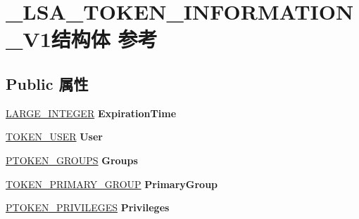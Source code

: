 \hypertarget{struct___l_s_a___t_o_k_e_n___i_n_f_o_r_m_a_t_i_o_n___v1}{}\section{\+\_\+\+L\+S\+A\+\_\+\+T\+O\+K\+E\+N\+\_\+\+I\+N\+F\+O\+R\+M\+A\+T\+I\+O\+N\+\_\+\+V1结构体 参考}
\label{struct___l_s_a___t_o_k_e_n___i_n_f_o_r_m_a_t_i_o_n___v1}
\subsection*{Public 属性}
\begin{DoxyCompactItemize}
\item 
\mbox{\label{struct___l_s_a___t_o_k_e_n___i_n_f_o_r_m_a_t_i_o_n___v1_afc312f077c3852fe221649f57e317bb9}} 
\hyperlink{union___l_a_r_g_e___i_n_t_e_g_e_r}{L\+A\+R\+G\+E\+\_\+\+I\+N\+T\+E\+G\+ER} {\bfseries Expiration\+Time}
\item 
\mbox{\label{struct___l_s_a___t_o_k_e_n___i_n_f_o_r_m_a_t_i_o_n___v1_a030b4684f9ac4a7db768589923152d96}} 
\hyperlink{struct___t_o_k_e_n___u_s_e_r}{T\+O\+K\+E\+N\+\_\+\+U\+S\+ER} {\bfseries User}
\item 
\mbox{\label{struct___l_s_a___t_o_k_e_n___i_n_f_o_r_m_a_t_i_o_n___v1_a4129f51642bb7feb11ef8d6518bc3c74}} 
\hyperlink{struct___t_o_k_e_n___g_r_o_u_p_s}{P\+T\+O\+K\+E\+N\+\_\+\+G\+R\+O\+U\+PS} {\bfseries Groups}
\item 
\mbox{\label{struct___l_s_a___t_o_k_e_n___i_n_f_o_r_m_a_t_i_o_n___v1_a4494c6c9afba626b7913a46400b5922a}} 
\hyperlink{struct___t_o_k_e_n___p_r_i_m_a_r_y___g_r_o_u_p}{T\+O\+K\+E\+N\+\_\+\+P\+R\+I\+M\+A\+R\+Y\+\_\+\+G\+R\+O\+UP} {\bfseries Primary\+Group}
\item 
\mbox{\label{struct___l_s_a___t_o_k_e_n___i_n_f_o_r_m_a_t_i_o_n___v1_a7cfd1a1e6420df3d8a67d403a3294065}} 
\hyperlink{struct___t_o_k_e_n___p_r_i_v_i_l_e_g_e_s}{P\+T\+O\+K\+E\+N\+\_\+\+P\+R\+I\+V\+I\+L\+E\+G\+ES} {\bfseries Privileges}

\end{DoxyCompactItemize}
